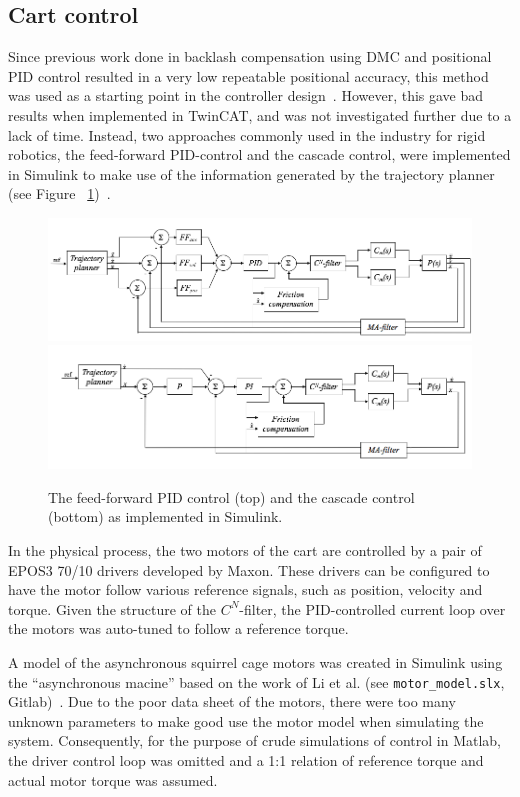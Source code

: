 \documentclass{article}
\begin{document}
\clearpage\subsection{Cart control}
Since previous work done in backlash compensation using DMC and positional PID control resulted in a very low repeatable positional accuracy, this method was used as a starting point in the controller design~\cite{Patrik:2013}. However, this gave bad results when implemented in TwinCAT, and was not investigated further due to a lack of time. Instead, two  approaches commonly used in the industry for rigid robotics, the feed-forward PID-control and the cascade control, were implemented in Simulink to make use of the information generated by the trajectory planner (see Figure ~\ref{fig:controlSimulink})~\cite{PID2015feedforward}.

\begin{figure}
\centering
\includegraphics[width = 0.8\linewidth]{figures/PIDfeed-forward.png}
\includegraphics[width = 0.8\linewidth]{figures/CascadeControl.png}
\caption{The feed-forward PID control  (top) and the cascade control (bottom) as implemented in Simulink.}
\label{fig:controlSimulink}
\end{figure}

In the physical process, the two motors of the cart are controlled by a pair of EPOS3 70/10 drivers developed by Maxon. These drivers can be configured to have the motor follow various reference signals, such as position, velocity and torque. Given the structure of the $C^N$-filter, the PID-controlled current loop over the motors was auto-tuned to follow a reference torque.

A model of the asynchronous squirrel cage motors was created in Simulink using the ``asynchronous macine'' based on the work of Li et al. (see \texttt{motor\_model.slx}, Gitlab)~\cite{li2013modeling}. Due to the poor data sheet of the motors, there were too many unknown parameters to make good use the motor model when simulating the system. Consequently, for the purpose of crude simulations of control in Matlab, the driver control loop was omitted and a 1:1 relation of reference torque and actual motor torque was assumed.
\end{document}
